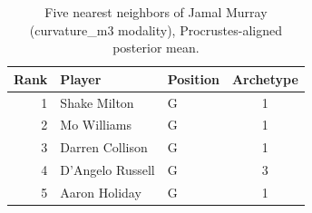 \begin{table}[htbp]
  \centering\small
  \begin{tabular}{rllc}
    \toprule
    Rank & Player & Position & Archetype \\
    \midrule
    1 & Shake Milton & G & 1 \\
    2 & Mo Williams & G & 1 \\
    3 & Darren Collison & G & 1 \\
    4 & D'Angelo Russell & G & 3 \\
    5 & Aaron Holiday & G & 1 \\
    \bottomrule
  \end{tabular}
  \caption{Five nearest neighbors of Jamal Murray (curvature_m3 modality), Procrustes-aligned posterior mean.}
  \label{tab:Jamal_Murray_neighbors_curvature_m3}
\end{table}

